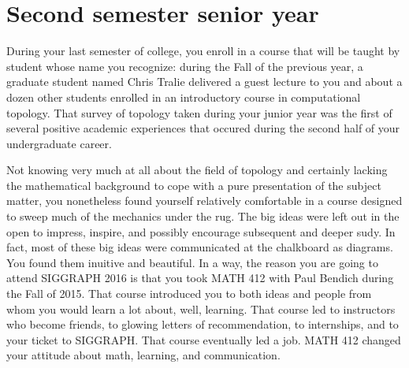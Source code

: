 \documentclass[../main.tex]{subfiles}
\begin{document}
\section{Second semester senior year}
 
During your last semester of college, you enroll in a course that will be taught by student whose name you recognize: during the Fall of the previous year, a graduate student named Chris Tralie delivered a guest lecture to you and about a dozen other students enrolled in an introductory course in computational topology. That survey of topology taken during your junior year was the first of several positive academic experiences that occured during the second half of your undergraduate career.

Not knowing very much at all about the field of topology and certainly lacking the mathematical background to cope with a pure presentation of the subject matter, you nonetheless found yourself relatively comfortable in a course designed to sweep much of the mechanics under the rug. The big ideas were left out in the open to impress, inspire, and possibly encourage subsequent and deeper sudy. In fact, most of these big ideas were communicated at the chalkboard as diagrams. You found them inuitive and beautiful. In a way, the reason you are going to attend SIGGRAPH 2016 is that you took MATH 412 with Paul Bendich during the Fall of 2015. That course introduced you to both ideas and people from whom you would learn a lot about, well, learning. That course led to instructors who become friends, to glowing letters of recommendation, to internships, and to your ticket to SIGGRAPH. That course eventually led a job. MATH 412 changed your attitude about math, learning, and communication.
\end{document}
